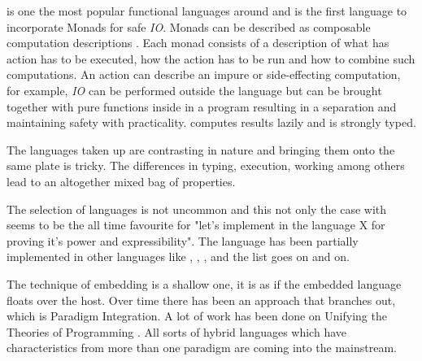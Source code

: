 \documentclass[thesis-solanki.tex]{subfiles}
\begin{document}
 is one the most popular \cite{website:langpop} functional languages around and is the 
first language to incorporate Monads \cite{wadler1992comprehending} for safe \textit{IO}. Monads can be 
described as composable computation descriptions \cite{website:monadshaskellorg} . Each monad consists of a 
description of what has action has to be executed, how the action has to be run and how to combine such 
computations. An action can describe an impure or side-effecting computation, for example, \textit{IO} can be 
performed outside the language but can be brought together with pure functions inside in a program resulting in a 
separation and maintaining safety with practicality.  computes results lazily and is strongly 
typed. 

The languages taken up are contrasting in nature and bringing them onto the same plate is tricky. The 
differences in typing, execution, working among others lead to an altogether mixed bag of properties.

The selection of languages is not uncommon and this not only the case with  seems 
to be the all time favourite for "let's implement  in the language X for proving it's power and 
expressibility". The  language has been partially implemented \cite{swipembedd} in other 
languages like  \cite{racklog},   
\cite{komorowski1982qlog,robinson1982loglisp,robinson1980loglisp},  \cite{wikiprolog, jlog}, 
 \cite{jscriptlog} and the list \cite{yieldprolog} goes on and on.    

The technique of embedding is a shallow one, it is as if the embedded language floats over the host. Over time 
there has been an approach that branches out, which is Paradigm Integration. A lot of work has been done on 
Unifying the Theories of Programming 
\cite{DBLP:conf/utp/2006,DBLP:conf/utp/2008,DBLP:conf/utp/2010,DBLP:conf/utp/2012,hoare1998unifying,
gibbons2013unifying}. All sorts of hybrid languages which have characteristics from more than one paradigm are 
coming into the mainstream.
\end{document}
